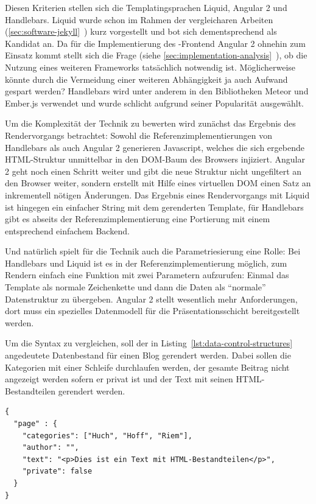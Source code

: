 Diesen Kriterien stellen sich die Templatingsprachen Liquid, Angular 2 und Handlebars. Liquid wurde schon im Rahmen der vergleicharen Arbeiten (\ref{sec:software-jekyll}~) kurz vorgestellt und bot sich dementsprechend als Kandidat an. Da für die Implementierung des \idename-Frontend Angular 2 ohnehin zum Einsatz kommt stellt sich die Frage (siehe \ref{sec:implementation-analysis}~), ob die Nutzung eines weiteren Frameworks tatsächlich notwendig ist. Möglicherweise könnte durch die Vermeidung einer weiteren Abhängigkeit ja auch Aufwand gespart werden? Handlebars wird unter anderem in den Bibliotheken Meteor und Ember.js verwendet und wurde schlicht aufgrund seiner Popularität ausgewählt.

Um die Komplexität der Technik zu bewerten wird zunächst das Ergebnis des Rendervorgangs betrachtet: Sowohl die Referenzimplementierungen von Handlebars als auch Angular 2 generieren Javascript, welches die sich ergebende HTML-Struktur unmittelbar in den DOM-Baum des Browsers injiziert. Angular 2 geht noch einen Schritt weiter und gibt die neue Struktur nicht ungefiltert an den Browser weiter, sondern erstellt mit Hilfe eines virtuellen DOM einen Satz an inkrementell nötigen Änderungen. Das Ergebnis eines Rendervorgangs mit Liquid ist hingegen ein einfacher String mit dem gerenderten Template, für Handlebars gibt es abseits der Referenzimplementierung eine Portierung mit einem entsprechend einfachem Backend.

Und natürlich spielt für die Technik auch die Parametriesierung eine Rolle: Bei Handlebars und Liquid ist es in der Referenzimplementierung möglich, zum Rendern einfach eine Funktion mit zwei Parametern aufzurufen: Einmal das Template als normale Zeichenkette und dann die Daten als "`normale"' Datenstruktur zu übergeben. Angular 2 stellt wesentlich mehr Anforderungen, dort muss ein spezielles Datenmodell für die Präsentationsschicht bereitgestellt werden.

Um die Syntax zu vergleichen, soll der in Listing~\ref{lst:data-control-structures} angedeutete Datenbestand für einen Blog gerendert werden. Dabei sollen die Kategorien mit einer Schleife durchlaufen werden, der gesamte Beitrag nicht angezeigt werden sofern er privat ist und der Text mit seinen HTML-Bestandteilen gerendert werden.

\begin{lstlisting}[float=h!,caption={JSON-Darstellung eines exemplarischen Datenbestandes}, label={lst:data-control-structures}]
{ 
  "page" : {
    "categories": ["Huch", "Hoff", "Riem"],
    "author": "",
    "text": "<p>Dies ist ein Text mit HTML-Bestandteilen</p>",
    "private": false
  }
}
\end{lstlisting}



